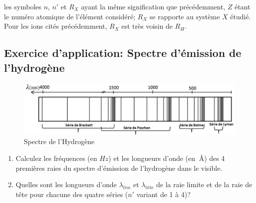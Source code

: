 \documentclass{article}
\begin{document}
\vspace{5mm}
les symboles $n$, $n'$ et $R_X$ ayant la même signification que précédemment, $Z$ étant le numéro atomique de l'élément considéré; $R_X$ se rapporte au système $X$ étudié. Pour les ions cités 
précédemment, $R_X$ est très voisin de $R_H$.

\newpage

\subsection*{Exercice d'application: Spectre d'émission de l'hydrogène}

\begin{figure}[h]
    \centering
    \includegraphics[width=0.9\linewidth]{Fig/Spectre-hydrogene.png}
    \caption{Spectre de l'Hydrogène}
    \label{fig:Spectre Hydrogene}
\end{figure}


\begin{enumerate}
    \item Calculez les fréquences (en $Hz$) et les longueurs d'onde (en $ \qty{}{\angstrom}$) des 4 premières raies 
    du spectre d'émission de l'hydrogène dans le visible.
    \item Quelles sont les longueurs d'onde $\lambda_{lim}$ et $\lambda_{\text{tête}}$ de la raie limite et de la raie de tête pour chacune des 
    quatre séries ($n'$ variant de 1 à 4)?
\end{enumerate}

\vspace{2.5cm}

\hspace{3.3cm}

\vspace{-5mm}
\hspace{-0.4cm}
\end{document}
